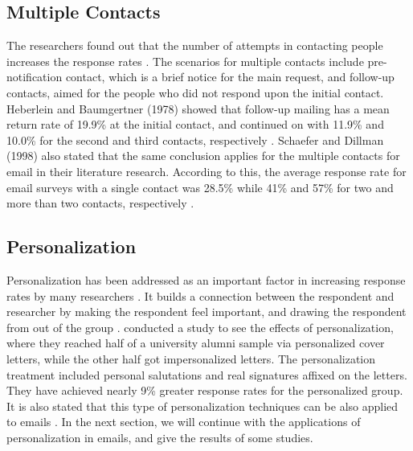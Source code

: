 \subsection{Multiple Contacts}
\label{sec:2.2.2:MultCont}
The researchers found out that the number of attempts in contacting people increases the response rates \citep{Heberlein1978,Schaefer1998}. The scenarios for multiple contacts include pre-notification contact, which is a brief notice for the main request, and follow-up contacts, aimed for the people who did not respond upon the initial contact. Heberlein and Baumgertner (1978) showed that follow-up mailing has a mean return rate of 19.9\% at the initial contact, and continued on with 11.9\% and 10.0\% for the second and third contacts, respectively \citep{Heberlein1978}. Schaefer and Dillman (1998) also stated that the same conclusion applies for the multiple contacts for email in their literature research. According to this, the average response rate for email surveys with a single contact was 28.5\% while 41\% and 57\% for two and more than two contacts, respectively \citep{Schaefer1998}.

\subsection{Personalization}
\label{sec:2.2.3:Pers}
Personalization has been addressed as an important factor in increasing response rates by many researchers \citep{Dillman1991,Schaefer1998}. It builds a connection between the respondent and researcher by making the respondent feel important, and drawing the respondent from out of the group \citep[page 272]{DillmanDonA.SmythJoleneD.Christian2009}. \cite{Dillman1974a} conducted a study to see the effects of personalization, where they reached half of a university alumni sample via personalized cover letters, while the other half got impersonalized letters. The personalization treatment included personal salutations and real signatures affixed on the letters. They have achieved nearly 9\% greater response rates for the personalized group. It is also stated that this type of personalization techniques can be also applied to emails \citep{Schaefer1998}. In the next section, we will continue with the applications of personalization in emails, and give the results of some studies.

